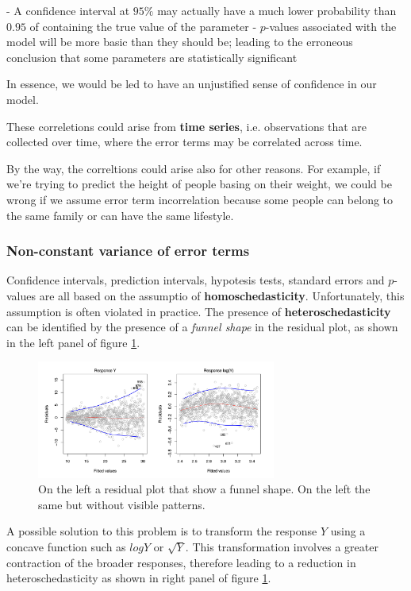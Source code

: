 - A confidence interval at $95\%$ may actually have a much lower probability than $0.95$ of containing the true value of the parameter
- $p$-values associated with the model will be more basic than they should be; leading to the erroneous conclusion that some parameters are statistically significant

In essence, we would be led to have an unjustified sense of confidence in our model.

These correletions could arise from \textbf{time series}, i.e. observations that are collected over time, where the error terms may be correlated across time. 

By the way, the correltions could arise also for other reasons. For example, if we're trying to predict the height of people basing on their weight, we could be wrong if we assume error term incorrelation because some people can belong to the same family or can have the same lifestyle.
\subsubsection*{Non-constant variance of error terms}
Confidence intervals, prediction intervals, hypotesis tests, standard errors and $p$-values are all based on the assumptio of \textbf{homoschedasticity}.
Unfortunately, this assumption is often violated in practice. The presence of \textbf{heteroschedasticity} can be identified by the presence of a \textit{funnel shape} in the residual plot, as shown in the left panel of figure \ref{fig:eteroschedasticity_example}.
\begin{figure}
    \centering
    \includegraphics[width=0.7\textwidth]{./figures/chapter_3/eteroschedasticity_example.png}
    \caption{On the left a residual plot that show a funnel shape. On the left the same but without visible patterns.}
    \label{fig:eteroschedasticity_example}
\end{figure}

A possible solution to this problem is to transform the response $Y$ using a concave function such as $log Y$ or $\sqrt{Y}$. This transformation involves a greater contraction of the broader responses, therefore leading to a reduction in heteroschedasticity as shown in right panel of figure \ref{fig:eteroschedasticity_example}.
